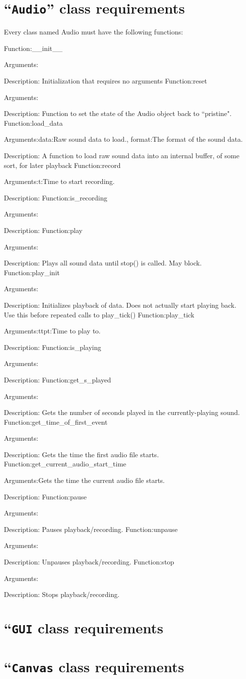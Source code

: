 \documentclass{article}
\newcommand{\functiondefinition}[3]{Function:#1

Arguments:#2

Description: #3}
\begin{document}
\section{``{\tt Audio}'' class requirements}

Every class named Audio must have the following functions:

\functiondefinition{\_\_init\_\_}{}{Initialization that requires no arguments}
\functiondefinition{reset}{}{Function to set the state of the Audio object back to ``pristine".}
\functiondefinition{load\_data}{data:Raw sound data to load., format:The format of the sound data.}{A function to load raw sound data into an internal buffer, of some sort, for later playback}
\functiondefinition{record}{t:Time to start recording.}{}
\functiondefinition{is\_recording}{}{}
\functiondefinition{play}{}{Plays all sound data until stop() is called.  May block.}
\functiondefinition{play\_init}{}{Initializes playback of data.  Does not actually start playing back.  Use this before repeated calls to play\_tick()}
\functiondefinition{play\_tick}{ttpt:Time to play to.}{}
\functiondefinition{is\_playing}{}{}
\functiondefinition{get\_s\_played}{}{Gets the number of seconds played in the currently-playing sound.}
\functiondefinition{get\_time\_of\_first\_event}{}{Gets the time the first audio file starts.}
\functiondefinition{get\_current\_audio\_start\_time}{Gets the time the current audio file starts.}
\functiondefinition{pause}{}{Pauses playback/recording.}
\functiondefinition{unpause}{}{Unpauses playback/recording.}
\functiondefinition{stop}{}{Stops playback/recording.}

\section{``{\tt GUI} class requirements}

\section{``{\tt Canvas} class requirements}
\end{document}
